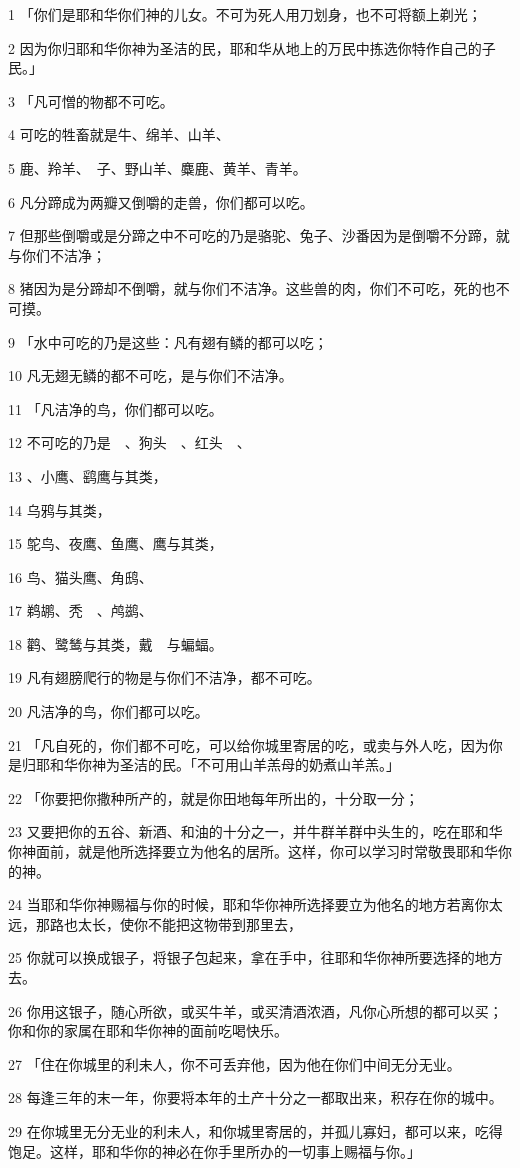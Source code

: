 \par 1 「你们是耶和华你们神的儿女。不可为死人用刀划身，也不可将额上剃光；
\par 2 因为你归耶和华你神为圣洁的民，耶和华从地上的万民中拣选你特作自己的子民。」
\par 3 「凡可憎的物都不可吃。
\par 4 可吃的牲畜就是牛、绵羊、山羊、
\par 5 鹿、羚羊、　子、野山羊、麋鹿、黄羊、青羊。
\par 6 凡分蹄成为两瓣又倒嚼的走兽，你们都可以吃。
\par 7 但那些倒嚼或是分蹄之中不可吃的乃是骆驼、兔子、沙番因为是倒嚼不分蹄，就与你们不洁净；
\par 8 猪因为是分蹄却不倒嚼，就与你们不洁净。这些兽的肉，你们不可吃，死的也不可摸。
\par 9 「水中可吃的乃是这些：凡有翅有鳞的都可以吃；
\par 10 凡无翅无鳞的都不可吃，是与你们不洁净。
\par 11 「凡洁净的鸟，你们都可以吃。
\par 12 不可吃的乃是　、狗头　、红头　、
\par 13 、小鹰、鹞鹰与其类，
\par 14 乌鸦与其类，
\par 15 鸵鸟、夜鹰、鱼鹰、鹰与其类，
\par 16 鸟、猫头鹰、角鸱、
\par 17 鹈鹕、秃　、鸬鹚、
\par 18 鹳、鹭鸶与其类，戴　与蝙蝠。
\par 19 凡有翅膀爬行的物是与你们不洁净，都不可吃。
\par 20 凡洁净的鸟，你们都可以吃。
\par 21 「凡自死的，你们都不可吃，可以给你城里寄居的吃，或卖与外人吃，因为你是归耶和华你神为圣洁的民。「不可用山羊羔母的奶煮山羊羔。」
\par 22 「你要把你撒种所产的，就是你田地每年所出的，十分取一分；
\par 23 又要把你的五谷、新酒、和油的十分之一，并牛群羊群中头生的，吃在耶和华你神面前，就是他所选择要立为他名的居所。这样，你可以学习时常敬畏耶和华你的神。
\par 24 当耶和华你神赐福与你的时候，耶和华你神所选择要立为他名的地方若离你太远，那路也太长，使你不能把这物带到那里去，
\par 25 你就可以换成银子，将银子包起来，拿在手中，往耶和华你神所要选择的地方去。
\par 26 你用这银子，随心所欲，或买牛羊，或买清酒浓酒，凡你心所想的都可以买；你和你的家属在耶和华你神的面前吃喝快乐。
\par 27 「住在你城里的利未人，你不可丢弃他，因为他在你们中间无分无业。
\par 28 每逢三年的末一年，你要将本年的土产十分之一都取出来，积存在你的城中。
\par 29 在你城里无分无业的利未人，和你城里寄居的，并孤儿寡妇，都可以来，吃得饱足。这样，耶和华你的神必在你手里所办的一切事上赐福与你。」

